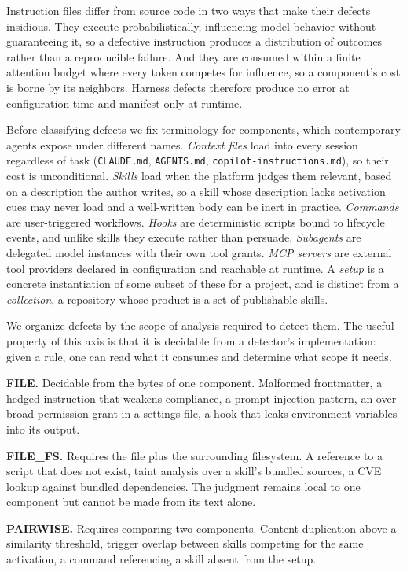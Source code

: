 \documentclass[conference]{IEEEtran}
\begin{document}
Instruction files differ from source code in two ways that make their defects
insidious. They execute probabilistically, influencing model behavior without
guaranteeing it, so a defective instruction produces a distribution of outcomes
rather than a reproducible failure. And they are consumed within a finite
attention budget where every token competes for influence, so a component's cost
is borne by its neighbors. Harness defects therefore produce no error at
configuration time and manifest only at runtime.

Before classifying defects we fix terminology for components, which contemporary
agents expose under different names. \emph{Context files} load into every session
regardless of task (\texttt{CLAUDE.md}, \texttt{AGENTS.md},
\texttt{copilot-instructions.md}), so their cost is unconditional.
\emph{Skills} load when the platform judges them relevant, based on a
description the author writes, so a skill whose description lacks activation cues
may never load and a well-written body can be inert in practice.
\emph{Commands} are user-triggered workflows. \emph{Hooks} are deterministic
scripts bound to lifecycle events, and unlike skills they execute rather than
persuade. \emph{Subagents} are delegated model instances with their own tool
grants. \emph{MCP servers} are external tool providers declared in configuration
and reachable at runtime. A \emph{setup} is a concrete instantiation of some
subset of these for a project, and is distinct from a \emph{collection}, a
repository whose product is a set of publishable skills.

We organize defects by the scope of analysis required to detect them. The useful
property of this axis is that it is decidable from a detector's implementation:
given a rule, one can read what it consumes and determine what scope it needs.

\textbf{FILE.} Decidable from the bytes of one component. Malformed frontmatter,
a hedged instruction that weakens compliance, a prompt-injection pattern, an
over-broad permission grant in a settings file, a hook that leaks environment
variables into its output.

\textbf{FILE\_FS.} Requires the file plus the surrounding filesystem. A
reference to a script that does not exist, taint analysis over a skill's bundled
sources, a CVE lookup against bundled dependencies. The judgment remains local
to one component but cannot be made from its text alone.

\textbf{PAIRWISE.} Requires comparing two components. Content duplication above
a similarity threshold, trigger overlap between skills competing for the same
activation, a command referencing a skill absent from the setup.
\end{document}
